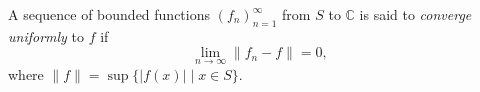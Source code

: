 A sequence of bounded functions $(f_n)_{n=1}^{\infty}$ from $S$ to $\mathbb{C}$ is said to \emph{converge uniformly} to $f$ if
$$
\lim_{n \to \infty} \|f_n - f\| = 0,
$$
where $\|f\| = \sup \{|f(x)| \mid x \in S\}$.
